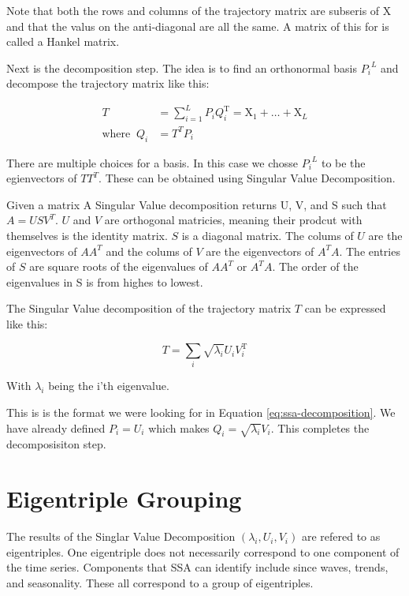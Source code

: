 Note that both the rows and columns of the trajectory matrix are subseris of X and that the valus on the anti-diagonal are all the same. A matrix of this for is called a Hankel matrix. 

Next is the decomposition step. The idea is to find an orthonormal basis ${P_i}^L$ and decompose the trajectory matrix like this: 

\begin{equation}
   \begin{aligned}
   T&=\sum_{i=1}^{L} P_{i} Q_{i}^{\mathrm{T}}=\mathrm{X}_{1}+\ldots+\mathrm{X}_{L} \\
   \text{where} \;\; Q_i &= T^TP_i
   \end{aligned}
   \label{eq:ssa-decomposition}
\end{equation}

There are multiple choices for a basis. In this case we chosse ${P_i}^L$ to be the egienvectors of $TT^T$. These can be obtained using Singular Value Decomposition. 

Given a matrix A Singular Value decomposition returns U, V, and S such that $A = USV^T$. $U$ and $V$ are orthogonal matricies, meaning their prodcut with themselves is the identity matrix. $S$ is a diagonal matrix. The colums of $U$ are the eigenvectors of $AA^T$ and the colums of $V$ are the eigenvectors of $A^TA$. The entries of $S$ are square roots of the eigenvalues of $AA^T$ or $A^TA$. The order of the eigenvalues in S is from highes to lowest. 

The Singular Value decomposition of the trajectory matrix $T$ can be expressed like this: 

\begin{equation}
T=\sum_{i} \sqrt{\lambda_{i}} U_{i} V_{i}^{\mathrm{T}}
\end{equation}

With $\lambda_i$ being the i'th eigenvalue.

This is is the format we were looking for in Equation \eqref{eq:ssa-decomposition}. We have already defined $P_i=U_i$ which makes $Q_i = \sqrt{\lambda_i}V_i$. This completes the decomposisiton step.

\section{Eigentriple Grouping}

The results of the Singlar Value Decomposition $(\lambda_i, U_i, V_i)$ are refered to as eigentriples. One eigentriple does not necessarily correspond to one component of the time series. Components that SSA can identify include since waves, trends, and seasonality. These all correspond to a group of eigentriples. 

